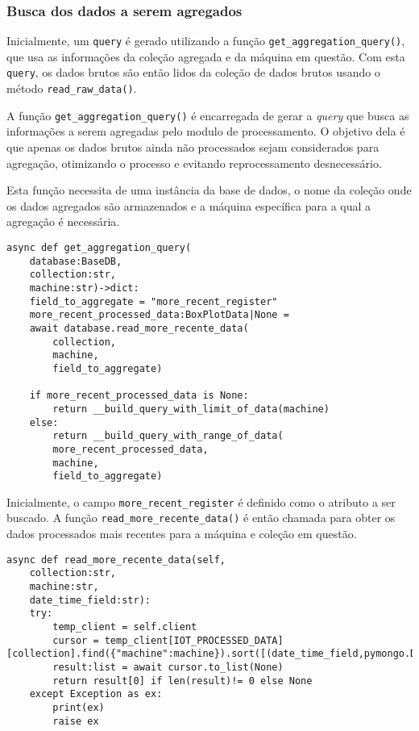 \subsubsection{Busca dos dados a serem agregados}
Inicialmente, um \texttt{query} é gerado utilizando a função \texttt{get\_aggregation\_query()}, que usa as informações da coleção agregada e da máquina em questão. Com esta \texttt{query}, os dados brutos são então lidos da coleção de dados brutos usando o método \texttt{read\_raw\_data()}.

A função \texttt{get\_aggregation\_query()} é encarregada de gerar a \textit{query} que busca as informações a serem agregadas pelo modulo de processamento. O objetivo dela é que apenas os dados brutos ainda não processados sejam considerados para agregação, otimizando o processo e evitando reprocessamento desnecessário.

Esta função necessita de uma instância da base de dados, o nome da coleção onde os dados agregados são armazenados e a máquina específica para a qual a agregação é necessária.

\begin{verbatim}
async def get_aggregation_query(
    database:BaseDB,
    collection:str,
    machine:str)->dict:
    field_to_aggregate = "more_recent_register"
    more_recent_processed_data:BoxPlotData|None = 
    await database.read_more_recente_data(
        collection,
        machine,
        field_to_aggregate)
    
    if more_recent_processed_data is None:
        return __build_query_with_limit_of_data(machine) 
    else:
        return __build_query_with_range_of_data(
        more_recent_processed_data,
        machine,
        field_to_aggregate)
\end{verbatim}

Inicialmente, o campo \texttt{more\_recent\_register} é definido como o atributo a ser buscado. A função \texttt{read\_more\_recente\_data()} é então chamada para obter os dados processados mais recentes para a máquina e coleção em questão.

\begin{verbatim}
async def read_more_recente_data(self,
    collection:str,
    machine:str,
    date_time_field:str):
    try:
        temp_client = self.client
        cursor = temp_client[IOT_PROCESSED_DATA][collection].find({"machine":machine}).sort([(date_time_field,pymongo.DESCENDING)])
        result:list = await cursor.to_list(None)
        return result[0] if len(result)!= 0 else None
    except Exception as ex:
        print(ex)
        raise ex
\end{verbatim}

